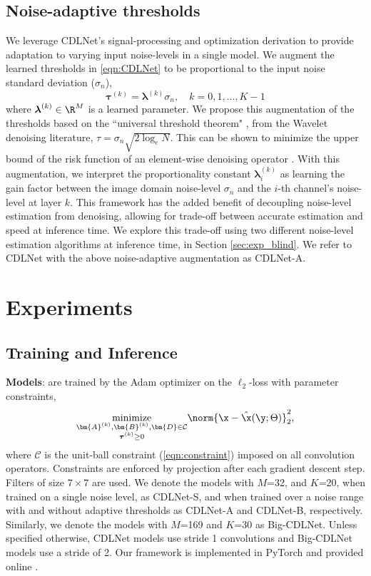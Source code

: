 \documentclass[conference]{IEEEtran}
\begin{document}
\subsection{Noise-adaptive thresholds} \label{sec:prop_ada}
We leverage CDLNet's signal-processing and optimization derivation to provide adaptation to varying input noise-levels in a single model. We augment the learned thresholds in \eqref{eqn:CDLNet} to be proportional to the input noise standard deviation ($\sigma_n$), 
\begin{equation}
\boldsymbol{\tau}^{(k)} = \boldsymbol{\lambda}^{(k)}\sigma_n, \quad k=0,1,\dots, K-1 
\end{equation}
where $\boldsymbol{\lambda}^{(k)}\in\R^M$ is a learned parameter. We propose this augmentation of the thresholds based on the ``universal threshold theorem" \cite{Mallat}, from the Wavelet denoising literature,
$\tau = \sigma_n \sqrt{2\log_e N}$.
This can be shown to minimize the upper bound of the risk function of an element-wise denoising operator \cite{Mallat}.
With this augmentation, we interpret the proportionality constant $\boldsymbol{\lambda}^{(k)}_i$ as learning the gain factor between the image domain noise-level $\sigma_n$ and the $i$-th channel's noise-level at layer $k$. This framework has the added benefit of decoupling noise-level estimation from denoising, allowing for trade-off between accurate estimation and speed at inference time. We explore this trade-off using two different noise-level estimation algorithms at inference time, in Section \ref{sec:exp_blind}. We refer to CDLNet with the above noise-adaptive augmentation as CDLNet-A. 

\section{Experiments} \label{sec:exp}
\subsection{Training and Inference}
\textbf{Models}: are trained by the Adam \cite{adam} optimizer on the $\ell_2$-loss with parameter constraints,
\begin{equation}
\underset{
\substack{
\bm{A}^{(k)}, \bm{B}^{(k)}, \bm{D} \in \mathcal{C} \\ 
\boldsymbol{\tau}^{(k)} \geq 0
}
}{\mathrm{minimize}} \norm{\x - \hat{\x}(\y;\Theta)}_2^2,
\end{equation}
where $\mathcal{C}$ is the unit-ball constraint (\ref{eqn:constraint}) imposed on all convolution operators. Constraints are enforced by projection after each gradient descent step. Filters of size $7\times 7$ are used. We denote the models with $M$=32, and $K$=20, when trained on a single noise level, as CDLNet-S, and when trained over a noise range with and without adaptive thresholds as \mbox{CDLNet-A} and \mbox{CDLNet-B}, respectively. Similarly, we denote the models with $M$=169 and $K$=30 as Big-CDLNet. Unless specified otherwise, CDLNet models use stride 1 convolutions and Big-CDLNet models use a stride of 2. Our framework is implemented in PyTorch and provided online \cite{GithubLink}.
\end{document}
